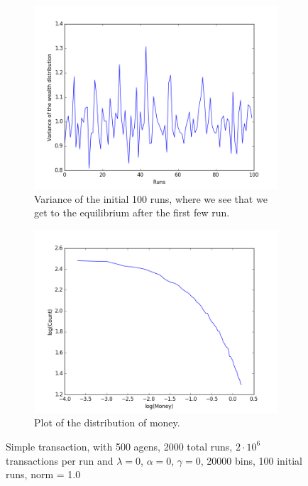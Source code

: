 \documentclass[a4paper,11pt]{article}
\begin{document}
{\begin{figure}[H]
	\centering
	\begin{subfigure}[t]{0.45\textwidth}
		\includegraphics[scale=0.4]{propersimpleinit}
		\caption{Variance of the initial 100 runs, where we see that we get to the equilibrium after the first few run.}
		\label{fig:propersimpleinit}
	\end{subfigure}
	\begin{subfigure}[t]{0.45\textwidth}
		\includegraphics[scale=0.4]{Proper_simple_transaction_log}
		\caption{Plot of the distribution of money. }
		\label{fig:Proper_simple_transaction_log}
	\end{subfigure}
	\caption{Simple transaction, with 500 agens, 2000 total runs, $2\cdot 10^{6}$ transactions per run and  $\lambda=0$, $\alpha=0$, $\gamma=0$, 20000 bins, 100 initial runs, norm = 1.0}
	\label{fig:simple}
\end{figure}







}
\end{document}
